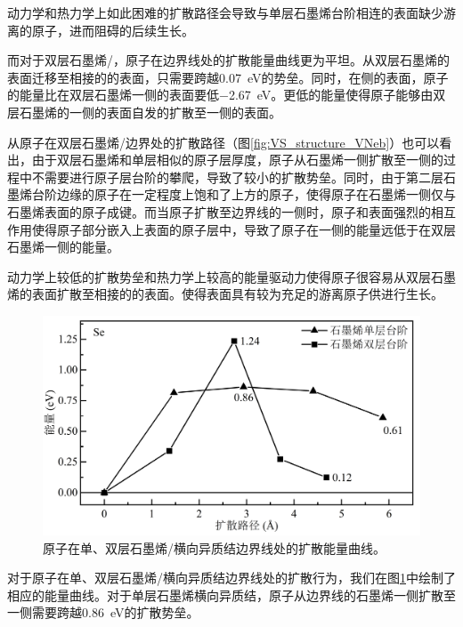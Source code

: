     动力学和热力学上如此困难的扩散路径会导致与单层石墨烯台阶相连的表面缺少游离的原子，进而阻碍的后续生长。

    而对于双层石墨烯/，原子在边界线处的扩散能量曲线更为平坦。从双层石墨烯的表面迁移至相接的的表面，只需要跨越\SI{0.07}{\electronvolt}的势垒。同时，在侧的表面，原子的能量比在双层石墨烯一侧的表面要低\SI{-2.67}{\electronvolt}。更低的能量使得原子能够由双层石墨烯的一侧的表面自发的扩散至一侧的表面。

    从原子在双层石墨烯/边界处的扩散路径（图\ref{fig:VS_structure_VNeb}）也可以看出，由于双层石墨烯和单层相似的原子层厚度，原子从石墨烯一侧扩散至一侧的过程中不需要进行原子层台阶的攀爬，导致了较小的扩散势垒。同时，由于第二层石墨烯台阶边缘的原子在一定程度上饱和了上方的原子，使得原子在石墨烯一侧仅与石墨烯表面的原子成键。而当原子扩散至边界线的一侧时，原子和表面强烈的相互作用使得原子部分嵌入上表面的原子层中，导致了原子在一侧的能量远低于在双层石墨烯一侧的能量。

    动力学上较低的扩散势垒和热力学上较高的能量驱动力使得原子很容易从双层石墨烯的表面扩散至相接的的表面。使得表面具有较为充足的游离原子供进行生长。

    \begin{figure}[htb]
        \includegraphics{pic/VS_DFT_NEB_Se_GtVSe.png}
        \caption{原子在单、双层石墨烯/横向异质结边界线处的扩散能量曲线。}
        \label{fig:VS_DFT_NEB_Se_GtVSe}
    \end{figure}

    对于原子在单、双层石墨烯/横向异质结边界线处的扩散行为，我们在图\ref{fig:VS_DFT_NEB_Se_GtVSe}中绘制了相应的能量曲线。对于单层石墨烯横向异质结，原子从边界线的石墨烯一侧扩散至一侧需要跨越\SI{0.86}{\electronvolt}的扩散势垒。
    
